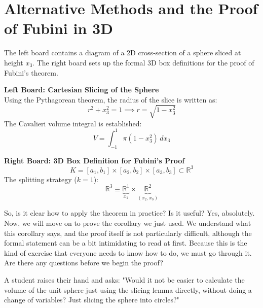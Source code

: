 \section{Alternative Methods and the Proof of Fubini in 3D}

\begin{nice-box}
The left board contains a diagram of a 2D cross-section of a sphere sliced at height $x_3$. The right board sets up the formal 3D box definitions for the proof of Fubini's theorem.
\end{nice-box}

\begin{math-stroke}
\textbf{Left Board: Cartesian Slicing of the Sphere} \\
Using the Pythagorean theorem, the radius of the slice is written as:
\[
r^2 + x_3^2 = 1 \implies r = \sqrt{1 - x_3^2}
\]
The Cavalieri volume integral is established:
\[
V = \int_{-1}^{1} \pi (1 - x_3^2) \, dx_3
\]

\textbf{Right Board: 3D Box Definition for Fubini's Proof}
\[
K = [a_1, b_1] \times [a_2, b_2] \times [a_3, b_3] \subset \mathbb{R}^3
\]
The splitting strategy ($k=1$):
\[
\mathbb{R}^3 \equiv \underbrace{\mathbb{R}^1}_{x_1} \times \underbrace{\mathbb{R}^2}_{(x_2, x_3)}
\]
\end{math-stroke}
\begin{spoken-clean}[15:00 - 18:38]
So, is it clear how to apply the theorem in practice? Is it useful? Yes, absolutely. Now, we will move on to prove the corollary we just used. We understand what this corollary says, and the proof itself is not particularly difficult, although the formal statement can be a bit intimidating to read at first. Because this is the kind of exercise that everyone needs to know how to do, we must go through it. Are there any questions before we begin the proof?
\end{spoken-clean}

\begin{student-question}
A student raises their hand and asks: "Would it not be easier to calculate the volume of the unit sphere just using the slicing lemma directly, without doing a change of variables? Just slicing the sphere into circles?"
\end{student-question}

